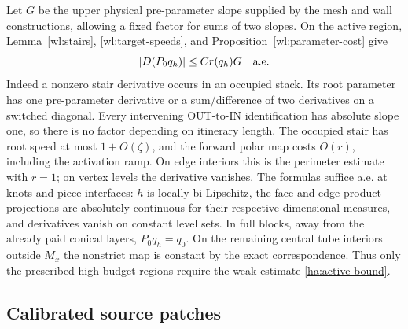 Let $G$ be the upper physical pre-parameter slope supplied by the
mesh and wall constructions, allowing a fixed factor for sums of
two slopes.  On the active region, Lemma~\ref{wl:stairs},
\eqref{wl:target-speeds}, and Proposition~\ref{wl:parameter-cost} give
\begin{equation}\label{ha:active-bound}
                      |D(P_0q_h)|\le Cr(q_h)G
                      \quad\hbox{a.e.}
\end{equation}
Indeed a nonzero stair derivative occurs in an occupied stack.  Its
root parameter has one pre-parameter derivative or a sum/difference
of two derivatives on a switched diagonal.  Every intervening
OUT-to-IN identification has absolute slope one, so there is no
factor depending on itinerary length.  The occupied stair has root
speed at most $1+O(\zeta)$, and the forward polar map costs $O(r)$,
including the activation ramp.  On edge interiors this is the
perimeter estimate with $r=1$; on vertex levels the derivative
vanishes.  The formulas suffice a.e. at knots and piece interfaces:
$h$ is locally bi-Lipschitz, the face and edge product projections
are absolutely continuous for their respective dimensional measures,
and derivatives vanish on constant level sets.  In full blocks,
away from the already paid conical layers, $P_0q_h=q_0$.  On the
remaining central tube interiors outside $M_x$ the nonstrict map is
constant by the exact correspondence.  Thus only the prescribed
high-budget regions require the weak estimate
\eqref{ha:active-bound}.

\subsection{Calibrated source patches}
\label{ha:patches}

